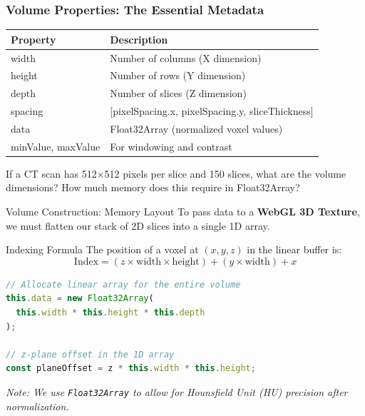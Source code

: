 \begin{frame}
\frametitle{Volume Properties: The Essential Metadata}

\begin{table}
\small
\centering
{}
\begin{tabular}{@{}ll@{}}
\toprule
\textbf{Property} & \textbf{Description} \\
\midrule
width & Number of columns (X dimension) \\
height & Number of rows (Y dimension) \\
depth & Number of slices (Z dimension) \\
spacing & [pixelSpacing.x, pixelSpacing.y, sliceThickness] \\
data & Float32Array (normalized voxel values) \\
minValue, maxValue & For windowing and contrast \\
\bottomrule
\end{tabular}
\end{table}

\vspace{0.5cm}
If a CT scan has 512×512 pixels per slice and 150 slices, what are the volume dimensions? How much memory does this require in Float32Array?
\end{frame}

\begin{frame}[fragile]{Volume Construction: Memory Layout}
To pass data to a \textbf{WebGL 3D Texture}, we must flatten our stack of 2D slices into a single 1D array.

\begin{block}{Indexing Formula}
The position of a voxel at $(x, y, z)$ in the linear buffer is:
\[ \text{Index} = (z \times \text{width} \times \text{height}) + (y \times \text{width}) + x \]
\end{block}

\begin{lstlisting}[language=JavaScript]
// Allocate linear array for the entire volume
this.data = new Float32Array(
  this.width * this.height * this.depth
);

// z-plane offset in the 1D array
const planeOffset = z * this.width * this.height;
\end{lstlisting}

\vfill
\small \textit{Note: We use \texttt{Float32Array} to allow for Hounsfield Unit (HU) precision after normalization.}
\end{frame}

